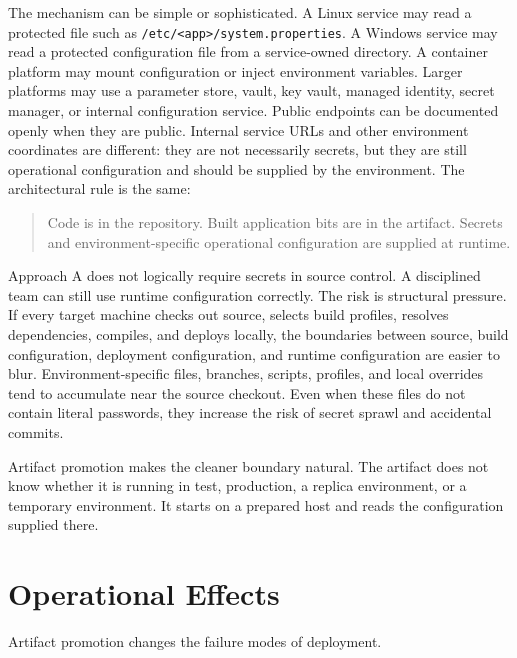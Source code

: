 \documentclass[11pt]{article}
\begin{document}
The mechanism can be simple or sophisticated. A Linux service may read a protected file such as \texttt{/etc/<app>/system.properties}. A Windows service may read a protected configuration file from a service-owned directory. A container platform may mount configuration or inject environment variables. Larger platforms may use a parameter store, vault, key vault, managed identity, secret manager, or internal configuration service. Public endpoints can be documented openly when they are public. Internal service URLs and other environment coordinates are different: they are not necessarily secrets, but they are still operational configuration and should be supplied by the environment. The architectural rule is the same:

\begin{quote}
Code is in the repository. Built application bits are in the artifact. Secrets and environment-specific operational configuration are supplied at runtime.
\end{quote}

Approach A does not logically require secrets in source control. A disciplined team can still use runtime configuration correctly. The risk is structural pressure. If every target machine checks out source, selects build profiles, resolves dependencies, compiles, and deploys locally, the boundaries between source, build configuration, deployment configuration, and runtime configuration are easier to blur. Environment-specific files, branches, scripts, profiles, and local overrides tend to accumulate near the source checkout. Even when these files do not contain literal passwords, they increase the risk of secret sprawl and accidental commits.

Artifact promotion makes the cleaner boundary natural. The artifact does not know whether it is running in test, production, a replica environment, or a temporary environment. It starts on a prepared host and reads the configuration supplied there.

\section{Operational Effects}

Artifact promotion changes the failure modes of deployment.
\end{document}
